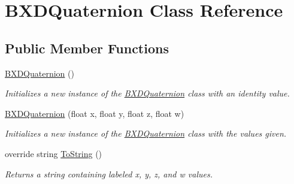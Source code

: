 \hypertarget{class_b_x_d_quaternion}{}\section{B\+X\+D\+Quaternion Class Reference}
\label{class_b_x_d_quaternion}
\subsection*{Public Member Functions}
\begin{DoxyCompactItemize}
\item 
\hyperlink{class_b_x_d_quaternion_a423e553992a00c9d4e1422516c200090}{B\+X\+D\+Quaternion} ()
\begin{DoxyCompactList}\small\item\em Initializes a new instance of the \hyperlink{class_b_x_d_quaternion}{B\+X\+D\+Quaternion} class with an identity value. \end{DoxyCompactList}\item 
\hyperlink{class_b_x_d_quaternion_a4dcf4ea887488e970b7fd53beef648e7}{B\+X\+D\+Quaternion} (float x, float y, float z, float w)
\begin{DoxyCompactList}\small\item\em Initializes a new instance of the \hyperlink{class_b_x_d_quaternion}{B\+X\+D\+Quaternion} class with the values given. \end{DoxyCompactList}\item 
override string \hyperlink{class_b_x_d_quaternion_a8fa8c074605296bcb4c7b6d3724dbbed}{To\+String} ()
\begin{DoxyCompactList}\small\item\em Returns a string containing labeled x, y, z, and w values. \end{DoxyCompactList}\end{DoxyCompactItemize}
